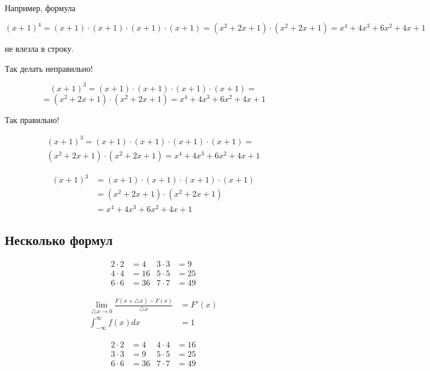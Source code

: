 \documentclass[12pt, a4paper]{article}
\begin{document}
Например, формула

 \[(x+1)^4 = (x+1) \cdot (x+1) \cdot (x+1) \cdot (x+1) = (x^2 + 2x + 1) \cdot (x^2 + 2x + 1) = x^4 + 4x^3 + 6x^2 + 4x+ 1 \]

не влезла в строку.


Так делать неправильно!

\[  (x+1)^3 = (x+1) \cdot (x+1) \cdot (x+1) \cdot (x+1) = \]
\[= (x^2 + 2x + 1) \cdot (x^2 + 2x + 1) = x^4 + 4x^3 + 6x^2 + 4x+ 1 \]

Так правильно!

\begin{multline}
	(x+1)^3 = (x+1) \cdot (x+1) \cdot (x+1) \cdot (x+1) = \\
	(x^2 + 2x + 1) \cdot (x^2 + 2x + 1) = x^4 + 4x^3 + 6x^2 + 4x+ 1
\end{multline}


\begin{align*}
	(x+1)^3 & = (x+1) \cdot (x+1) \cdot (x+1) \cdot (x+1) \\
	        & = (x^2 + 2x + 1)  \cdot (x^2 + 2x + 1)    \\
	        & =  x^4 + 4x^3 + 6x^2 + 4x+ 1
\end{align*}


\subsection{Несколько формул}

\begin{align}
	2 \cdot 2 &= 4 & 3  \cdot 3 &= 9 \tag{1} \\ 
	4 \cdot 4 &= 16 & 5 \cdot 5 &= 25 \\
	6 \cdot 6 &= 36 & 7 \cdot 7 &= 49
\end{align}

\begin{align}
\lim_{\triangle{x} \to 0} \frac{F(x+\triangle{x})-F(x)}{\triangle{x}} &= F'(x) \tag{ææ} \\
\int_{-\infty}^{\infty}f(x)dx&=1 \tag{æææ}
\end{align}

\begin{equation}
	\begin{aligned}
		2 \cdot 2 &= 4 & 4 \cdot 4 &= 16 \\
		3 \cdot 3 &= 9 & 5 \cdot 5 &= 25 \\
		6 \cdot 6 &= 36 & 7 \cdot 7 &= 49
	\end{aligned}
\end{equation}
\end{document}
